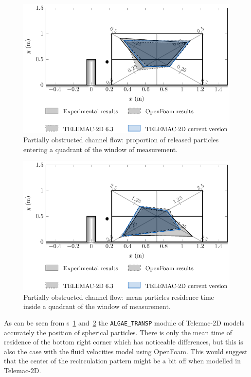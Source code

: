 \begin{figure}[H]%
\begin{center}
%
  \includegraphics[]{./Figures/CanalAlgQuadrantNpart}
%
\end{center}
\caption{Partially obstructed channel flow: proportion of released particles entering a quadrant of the window of measurement.}
\label{fig:quadrant_npart}
\end{figure}

\begin{figure}[H]%
\begin{center}
%
  \includegraphics[]{./Figures/CanalAlgQuadrantTrsd}
%
\end{center}
\caption{Partially obstructed channel flow: mean particles residence time inside a quadrant of the window of measurement.}
\label{fig:quadrant_tresid}
\end{figure}

As can be seen from \figurename{}s~\ref{fig:quadrant_npart} and~\ref{fig:quadrant_tresid} the \texttt{ALGAE\_TRANSP} module of
Telemac-2D models accurately the position of spherical particles. There is only the mean time of residence of the bottom right
corner which has noticeable differences, but this is also the case with the fluid velocities model using OpenFoam. This would
suggest that the center of the recirculation pattern might be a bit off when modelled in Telemac-2D.

